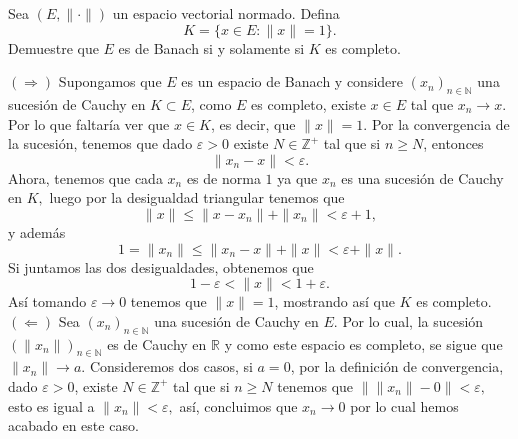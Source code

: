Sea $(E, \| \cdot \|)$ un espacio vectorial normado. Defina
\[
K = \{x \in E : \|x\| = 1\}.
\]
Demuestre que $E$ es de Banach si y solamente si $K$ es completo.
\begin{sproof}
  $(\Rightarrow)$ Supongamos que $E$ es un espacio de Banach y considere $(x_n)_{n\in\mathbb{N}}$ una sucesión de Cauchy en $K\subset E$, como $E$ es completo, existe $x\in E$ tal que $x_n\to x$. Por lo que faltaría ver que $x\in K$, es decir, que $\|x\|=1.$ Por la convergencia de la sucesión, tenemos que dado $\varepsilon>0$ existe $N\in\mathbb{Z}^+$ tal que si $n\geq N$, entonces
  $$\|x_n-x\|<\varepsilon.$$
  Ahora, tenemos que cada $x_n$ es de norma $1$ ya que $x_n$ es una sucesión de Cauchy en $K,$ luego por la desigualdad triangular tenemos que
  $$\|x\|\leq \|x-x_n\|+\|x_n\|<\varepsilon+1,$$
  y además
  $$1=\|x_n\|\leq\|x_n-x\|+\|x\|<\varepsilon+\|x\|.$$
  Si juntamos las dos desigualdades, obtenemos que
  $$1-\varepsilon<\|x\|<1+\varepsilon.$$
  Así tomando $\varepsilon\to 0$ tenemos que $\|x\|=1$, mostrando así que $K$ es completo.\\

  $(\Leftarrow)$ Sea $(x_n)_{n\in\mathbb{N}}$ una sucesión de Cauchy en $E$. Por lo cual, la sucesión  $(\|x_n\|)_{n\in\mathbb{N}}$ es de Cauchy en $\mathbb{R}$ y como este espacio es completo, se sigue que $\|x_n\|\to a.$ Consideremos dos casos, si $a=0$, por la definición de convergencia, dado $\varepsilon>0$, existe $N\in\mathbb{Z^+}$ tal que si $n\geq N$ tenemos que $\|\|x_n\|-0\|<\varepsilon,$ esto es igual a $\|x_n\|<\varepsilon,$ así,  concluimos que $x_n\to 0$ por lo cual hemos acabado en este caso.\\


\end{sproof}
